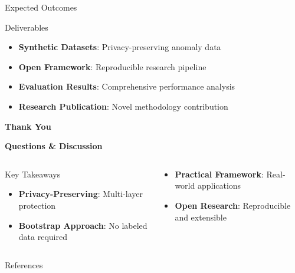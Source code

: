 \documentclass[aspectratio=169,xcolor={dvipsnames}]{beamer}
\begin{document}
\begin{frame}{Expected Outcomes}
  \begin{block}{Deliverables}
    \begin{itemize}
      \item \textbf{Synthetic Datasets}: Privacy-preserving anomaly data
      \item \textbf{Open Framework}: Reproducible research pipeline
      \item \textbf{Evaluation Results}: Comprehensive performance analysis
      \item \textbf{Research Publication}: Novel methodology contribution
    \end{itemize}
  \end{block}
\end{frame}

\begin{frame}[plain]
  \centering
  \Huge \textbf{Thank You}
  
  \vspace{0.5em}
  \Large \textbf{Questions \& Discussion}
  
  \vspace{1em}
  \begin{columns}[T,onlytextwidth]
    \begin{column}{0.48\textwidth}
      \begin{block}{Key Takeaways}
        \begin{itemize}
          \item \textbf{Privacy-Preserving}: Multi-layer protection
          \item \textbf{Bootstrap Approach}: No labeled data required
        \end{itemize}
      \end{block}
    \end{column}
    \hspace{0.04\textwidth}
    \begin{column}{0.48\textwidth}
      \begin{block}{}
        \begin{itemize}
          \item \textbf{Practical Framework}: Real-world applications
          \item \textbf{Open Research}: Reproducible and extensible
        \end{itemize}
      \end{block}
    \end{column}
  \end{columns}
\end{frame}

\begin{frame}[allowframebreaks]{References}
  \printbibliography
\end{frame}
\end{document}
